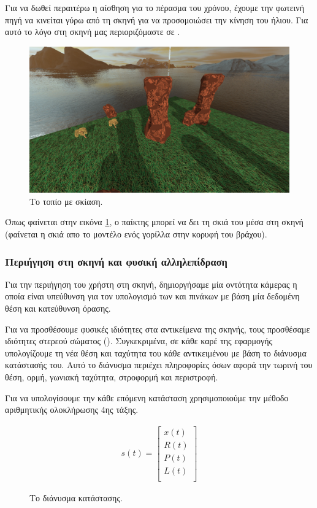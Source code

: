\documentclass[11pt]{scrartcl} %
\newenvironment{centerimg}[1]%
{%
    \begin{figure}[H]
        #1
    \begin{center}
}%
{%
    \end{center}
    \end{figure}
}
\begin{document}
Για να δωθεί περαιτέρω η αίσθηση για το πέρασμα του χρόνου, έχουμε την φωτεινή πηγή να κινείται 
γύρω από τη σκηνή για να προσομοιώσει την κίνηση του ήλιου. 
Για αυτό το λόγο στη σκηνή μας περιοριζόμαστε σε .

\begin{centerimg}{%
        \caption{Το τοπίο με σκίαση.} 
        \label{shadowscene}
    }
    \includegraphics[width=.7\textwidth]{./assets/shadows.png}
\end{centerimg}

Όπως φαίνεται στην εικόνα \ref{shadowscene}, ο παίκτης μπορεί να δει τη σκιά 
του μέσα στη σκηνή (φαίνεται η σκιά απο το μοντέλο ενός γορίλλα στην κορυφή του βράχου). 

\subsubsection{Περιήγηση στη σκηνή και φυσική αλληλεπίδραση}

Για την περιήγηση του χρήστη στη σκηνή, δημιοργήσαμε μία οντότητα κάμερας η οποία είναι υπεύθυνση 
για τον υπολογισμό των  και  πινάκων με βάση μία δεδομένη θέση και κατεύθυνση όρασης.

Για να προσθέσουμε φυσικές ιδιότητες στα αντικείμενα της σκηνής, τους προσθέσαμε ιδιότητες στερεού σώματος ().
Συγκεκριμένα, σε κάθε καρέ της εφαρμογής υπολογίζουμε τη νέα θέση και ταχύτητα του κάθε αντικειμένου με βάση το διάνυσμα κατάστασής 
του. Αυτό το διάνυσμα περιέχει πληροφορίες όσων αφορά την τωρινή του θέση, ορμή, γωνιακή ταχύτητα, στροφορμή και περιστροφή.

Για να υπολογίσουμε την κάθε επόμενη κατάσταση χρησιμοποιούμε την μέθοδο αριθμητικής ολοκλήρωσης  4ης τάξης.


\begin{figure}[H]
\begin{gather}
    s(t)
     =
  \begin{bmatrix}
      x(t) \\
      R(t) \\ 
      P(t) \\
      L(t) \\
   \end{bmatrix}
\end{gather}
    \caption{Το διάνυσμα κατάστασης.}
\end{figure}
\end{document}
